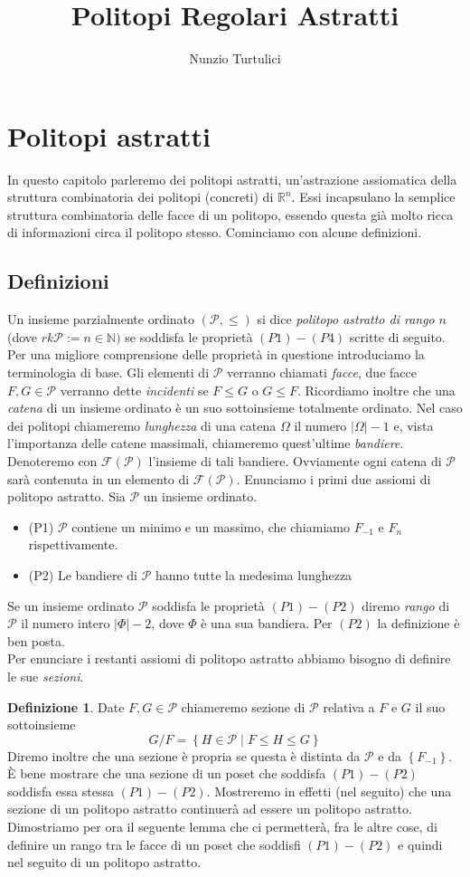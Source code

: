 \documentclass[a4paper,12pt]{report}
\author{Nunzio Turtulici}
\title{Politopi Regolari Astratti}
\newcommand{\Rn}{\mathbb{R}^n}
\newcommand{\p}{\mathcal{P}}
\theoremstyle{plain}
\theoremstyle{definition}
\newtheorem{defin}[teo]{Definizione}
\begin{document}
\section{Politopi astratti}
In questo capitolo parleremo dei politopi astratti, un'astrazione assiomatica della struttura combinatoria dei politopi (concreti) di $\Rn$.
Essi incapsulano la
semplice struttura combinatoria delle facce di un politopo, essendo questa gi\`a molto ricca di informazioni circa il politopo stesso. Cominciamo con alcune 
definizioni.
\subsection{Definizioni}
Un insieme parzialmente ordinato $(\p,\leq)$ si dice \emph{politopo astratto di rango} $n$ (dove $rk\p:=n\in\mathbb{N})$ se soddisfa le
propriet\`a $(P1)-(P4)$ scritte 
di seguito. Per una migliore comprensione delle propriet\`a in questione introduciamo la terminologia di base. Gli elementi di $\p$ verranno
chiamati \emph{facce},
due facce $F,G\in\p$ verranno dette \emph{incidenti} se $F\leq G$ o $G\leq F$. Ricordiamo inoltre che una \emph{catena} di un insieme ordinato \`e un suo 
sottoinsieme totalmente ordinato. Nel caso dei politopi chiameremo \emph{lunghezza} di una catena $\Omega$ il numero $\left|\Omega\right|-1$ e, vista
l'importanza delle catene massimali, chiameremo quest'ultime \emph{bandiere}.
Denoteremo con $\mathcal{F}(\p)$ l'insieme di tali bandiere. Ovviamente ogni catena di $\p$ sar\`a contenuta in un elemento di $\mathcal{F}(\p)$.
Enunciamo i primi due assiomi di politopo astratto. Sia $\p$ un insieme ordinato.
\begin{itemize}
\item (P1) $\p$ contiene un minimo e un massimo, che chiamiamo $F_{-1}$ e $F_n$ rispettivamente.
\item (P2) Le bandiere di $\p$ hanno tutte la medesima lunghezza
\end{itemize}
Se un insieme ordinato $\p$ soddisfa le propriet\`a $(P1)-(P2)$ diremo \emph{rango} di $\p$ il numero intero  $\left|\Phi\right|-2$, dove
$\Phi$ \`e una sua bandiera. Per $(P2)$ la definizione \`e ben posta.\\
Per enunciare i restanti assiomi di politopo astratto abbiamo bisogno di definire le sue \emph{sezioni}.
\begin{defin}
Date $F,G\in\p$ chiameremo sezione di $\p$ relativa a $F$ e $G$ il suo sottoinsieme
\begin{equation*}
G/F=\left\{H\in\p\mid F\leq H\leq G\right\}
\end{equation*}
Diremo inoltre che una sezione \`e propria se questa \`e distinta da $\p$ e da $\left\{F_{-1}\right\}$.
\`E bene mostrare che una sezione di un poset che soddisfa $(P1)-(P2)$ soddisfa essa stessa $(P1)-(P2)$. Mostreremo in effetti (nel seguito) che una sezione
 di un politopo astratto continuer\`a ad essere un politopo astratto. Dimostriamo per ora il seguente lemma che ci permetter\`a, fra le altre cose,
 di definire un rango tra le facce di un poset che soddisfi $(P1)-(P2)$ e quindi nel seguito di un politopo astratto.
\end{defin}
\end{document}
